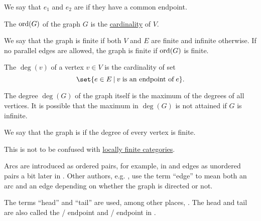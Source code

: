 \begin{definition}
\begin{thmenum}[resume=def:graph]
     We say that \( e_1 \) and \( e_2 \) are  if they have a common endpoint.

     The  \( \operatorname{ord}(G) \) of the graph \( G \) is the \hyperref[thm:cardinality_existence]{cardinality} of \( V \).

    We say that the graph is finite if both \( V \) and \( E \) are finite and infinite otherwise. If no parallel edges are allowed, the graph is finite if \( \operatorname{ord}(G) \) is finite.

     The  \( \deg(v) \) of a vertex \( v \in V \) is the cardinality of set
    \begin{equation*}
      \set{ e \in E \given v \T{is an endpoint of} e }.
    \end{equation*}

    The degree \( \deg(G) \) of the graph itself is the maximum of the degrees of all vertices. It is possible that the maximum in \( \deg(G) \) is not attained if \( G \) is infinite.

    We say that the graph is  if the degree of every vertex is finite.

    This is not to be confused with \hyperref[def:category_size]{locally finite categories}.
  \end{thmenum}
\end{definition}

\begin{remark}\label{rem:graph_endpoint_etymology}
  Arcs are introduced as ordered pairs, for example, in \cite[ch. 1, sec. 1.1]{GondranMinoux1984Graphs} and edges as unordered pairs a bit later in \cite[ch. 1, sec. 1.3]{GondranMinoux1984Graphs}. Other authors, e.g. \cite[sec. 5.2]{Erickson2019}, use the term \enquote{edge} to mean both an arc and an edge depending on whether the graph is directed or not.

  The terms \enquote{head} and \enquote{tail} are used, among other places, \cite[sec. 5.2]{Erickson2019}. The head and tail are also called the / endpoint and / endpoint in \cite[ch. 1, sec. 1.1]{GondranMinoux1984Graphs}.
\end{remark}

